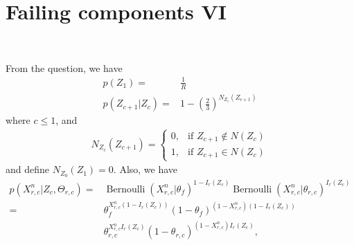 \documentclass[11pt]{extarticle}
\newcommand{\0}{\mathbf{0}}
\renewcommand{\(}{\left(}
\renewcommand{\)}{\right)}
\DeclareMathOperator{\Bernoulli}{Bernoulli}
\theoremstyle{definition}
\begin{document}
\section{Failing components VI}
\noindent{} \\
\par From the question, we have
\begin{align*}
	p(Z_{1}) =& \frac{1}{R} \\
	p(Z_{c+1} \vert Z_{c}) =& 1 - \left(\frac{2}{3}\right)^{N_{Z_c}(Z_{c+1})}
\end{align*}
where $c \leq 1$, and
\begin{align*}
	N_{Z_c}(Z_{c+1}) = 	\begin{cases}
						0, & \text{if $Z_{c+1} \not\in N(Z_{c})$} \\
						1, & \text{if $Z_{c+1} \in N(Z_{c})$}
					\end{cases}
\end{align*}
and define $N_{Z_{0}}(Z_{1}) = 0$. Also, we have
\begin{align*}
	p(X^{n}_{r,c} \vert Z_{c}, \Theta_{r,c}) =& \Bernoulli(X^{n}_{r,c} \vert \theta_{f})^{1 - I_{r}(Z_{c})} \Bernoulli(X^{n}_{r,c} \vert \theta_{r,c})^{I_{r}(Z_{c})} \\
	=& \theta_{f}^{X^{n}_{r,c}(1-I_{r}(Z_{c}))}(1-\theta_{f})^{(1-X^{n}_{r,c})(1-I_{r}(Z_{c}))} \\ & \theta_{r,c}^{X^{n}_{r,c}I_{r}(Z_{c})}(1-\theta_{r,c})^{(1-X^{n}_{r,c})I_{r}(Z_{c})},
\end{align*}
\end{document}
